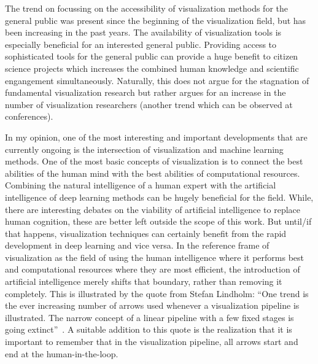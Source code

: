 The trend on focussing on the accessibility of visualization methods for the general public was present since the beginning of the visualization field, but has been increasing in the past years.  The availability of visualization tools is especially beneficial for an interested general public.  Providing access to sophisticated tools for the general public can provide a huge benefit to citizen science projects which increases the combined human knowledge and scientific engangement simultaneously.  Naturally, this does not argue for the stagnation of fundamental visualization research but rather argues for an increase in the number of visualization researchers (another trend which can be observed at conferences).

In my opinion, one of the most interesting and important developments that are currently ongoing is the intersection of visualization and machine learning methods.  One of the most basic concepts of visualization is to connect the best abilities of the human mind with the best abilities of computational resources.  Combining the natural intelligence of a human expert with the artificial intelligence of deep learning methods can be hugely beneficial for the field.  While, there are interesting debates on the viability of artificial intelligence to replace human cognition, these are better left outside the scope of this work.  But until/if that happens, visualization techniques can certainly benefit from the rapid development in deep learning and vice versa.  In the reference frame of visualization as the field of using the human intelligence where it performs best and computational resources where they are most efficient, the introduction of artificial intelligence merely shifts that boundary, rather than removing it completely.  This is illustrated by the quote from Stefan Lindholm: ``One trend is the ever increasing number of arrows used whenever a visualization pipeline is illustrated. The narrow concept of a linear pipeline with a few fixed stages is going extinct''~\cite{lindholm14medical}.  A suitable addition to this quote is the realization that it is important to remember that in the visualization pipeline, all arrows start and end at the human-in-the-loop.
